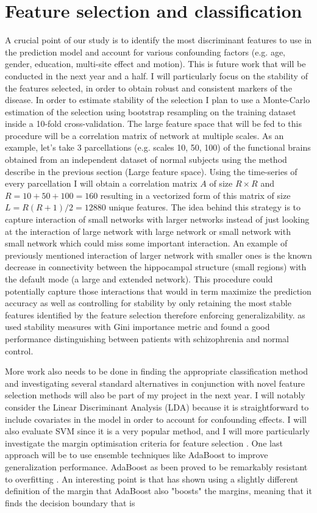 \section{Feature selection and classification} 
A crucial point of our study is to identify the most discriminant features to use in the prediction model and account for various confounding factors (e.g. age, gender, education, multi-site effect and motion). This is future work that will be conducted in the next year and a half. I will particularly focus on the stability of the features selected, in order to obtain robust and consistent markers of the disease. In order to estimate stability of the selection I plan to use a Monte-Carlo estimation of the selection using bootstrap resampling \citep{Efron1994,Bellec2010c} on the training dataset inside a 10-fold cross-validation. The large feature space that will be fed to this procedure will be a correlation matrix of network at multiple scales. As an example, let's take 3 parcellations (e.g. scales 10, 50, 100) of the functional brains obtained from an independent dataset of normal subjects using the method describe in the previous section (Large feature space). Using the time-series of every parcellation I 
will obtain a correlation matrix $A$ of size $R\times R$ and $R=10+50+100=160$ resulting in a vectorized form of this matrix of size $L=R(R+1)/2=12880$ unique features. The idea behind this strategy is to capture interaction of small networks with larger networks instead of just looking at the interaction of large network with large network or small network with small network which could miss some important interaction. An example of previously mentioned interaction of larger network with smaller ones is the known decrease in connectivity between the hippocampal structure (small regions) with the default mode (a large and extended network). This procedure could potentially capture those interactions that would in term maximize the prediction accuracy as well as controlling for stability by only retaining the most stable features identified by the feature selection therefore enforcing generalizability. \cite{Venkataraman2010} as used stability measures with Gini importance metric and found a good performance 
distinguishing between patients with schizophrenia and normal control.
\par
More work also needs to be done in finding the appropriate classification method and investigating several standard alternatives in conjunction with novel feature selection methods will also be part of my project in the next year. I will notably consider the Linear Discriminant Analysis (LDA) because it is straightforward to include covariates in the model in order to account for confounding effects. I will also evaluate SVM since it is a very popular method, and I will more particularly investigate the margin optimisation criteria for feature selection \citep{Gilad-bachrach2004,Kononenko1997}. One last approach will be to use ensemble techniques like AdaBoost \citep{Freund1997} to improve generalization performance. AdaBoost as been proved to be remarkably resistant to overfitting \citep{Schapire1998}. An interesting point is that \cite{Schapire1998} has shown using a slightly different definition of the margin that AdaBoost also "boosts" the margins, meaning that it finds the decision boundary that is 
